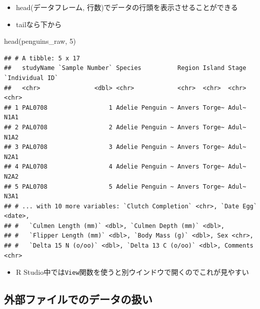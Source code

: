 \documentclass[
]{ltjsarticle}
\newenvironment{Shaded}{\begin{snugshade}}{\end{snugshade}}
\newcommand{\DecValTok}[1]{\textcolor[rgb]{0.00,0.00,0.81}{#1}}
\newcommand{\FunctionTok}[1]{\textcolor[rgb]{0.00,0.00,0.00}{#1}}
\newcommand{\NormalTok}[1]{#1}
\providecommand{\tightlist}{%
  \setlength{\itemsep}{0pt}\setlength{\parskip}{0pt}}
\begin{document}
\begin{itemize}
\tightlist
\item
  head(データフレーム, 行数)でデータの行頭を表示させることができる
\item
  tailなら下から
\end{itemize}

\begin{Shaded}
\begin{Highlighting}[]
\FunctionTok{head}\NormalTok{(penguins\_raw, }\DecValTok{5}\NormalTok{)}
\end{Highlighting}
\end{Shaded}

\begin{verbatim}
## # A tibble: 5 x 17
##   studyName `Sample Number` Species          Region Island Stage `Individual ID`
##   <chr>               <dbl> <chr>            <chr>  <chr>  <chr> <chr>          
## 1 PAL0708                 1 Adelie Penguin ~ Anvers Torge~ Adul~ N1A1           
## 2 PAL0708                 2 Adelie Penguin ~ Anvers Torge~ Adul~ N1A2           
## 3 PAL0708                 3 Adelie Penguin ~ Anvers Torge~ Adul~ N2A1           
## 4 PAL0708                 4 Adelie Penguin ~ Anvers Torge~ Adul~ N2A2           
## 5 PAL0708                 5 Adelie Penguin ~ Anvers Torge~ Adul~ N3A1           
## # ... with 10 more variables: `Clutch Completion` <chr>, `Date Egg` <date>,
## #   `Culmen Length (mm)` <dbl>, `Culmen Depth (mm)` <dbl>,
## #   `Flipper Length (mm)` <dbl>, `Body Mass (g)` <dbl>, Sex <chr>,
## #   `Delta 15 N (o/oo)` <dbl>, `Delta 13 C (o/oo)` <dbl>, Comments <chr>
\end{verbatim}

\begin{itemize}
\tightlist
\item
  R
  Studio中では\texttt{View}関数を使うと別ウインドウで開くのでこれが見やすい
\end{itemize}

\hypertarget{ux5916ux90e8ux30d5ux30a1ux30a4ux30ebux3067ux306eux30c7ux30fcux30bfux306eux6271ux3044}{%
\subsection{外部ファイルでのデータの扱い}\label{ux5916ux90e8ux30d5ux30a1ux30a4ux30ebux3067ux306eux30c7ux30fcux30bfux306eux6271ux3044}}
\end{document}
